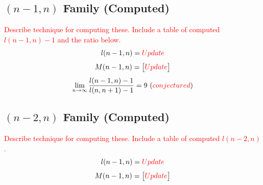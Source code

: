 \documentclass[12pt,titlepage]{article}
\begin{document}
\subsection{$(n-1,n)$ Family (Computed)}
\textcolor{red}{
Describe technique for computing these.  Include a table of computed
$l(n-1,n) - 1$ and the ratio below.
}
\begin{equation*}
l(n-1,n) = \textcolor{red}{Update}
\end{equation*}
\begin{equation*}
M(n-1,n) =
\begin{bmatrix}
\textcolor{red}{Update}
\end{bmatrix}
\end{equation*}
\begin{equation*}
\lim_{n \to \infty}\frac{l(n-1,n) - 1}{l(n,n+1) - 1} = 9
~(\textcolor{red}{conjectured})
\end{equation*}

\subsection{$(n-2,n)$ Family (Computed)}
\textcolor{red}{
Describe technique for computing these.  Include a table of computed
$l(n-2,n)$.
}
\begin{equation*}
l(n-1,n) = \textcolor{red}{Update}
\end{equation*}
\begin{equation*}
M(n-1,n) =
\begin{bmatrix}
\textcolor{red}{Update}
\end{bmatrix}
\end{equation*}
\end{document}
